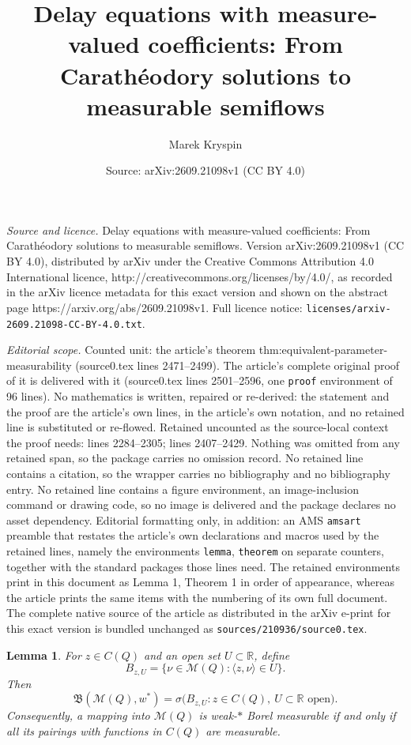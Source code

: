 \documentclass[10pt,a4paper]{amsart}
\title{Delay equations with measure-valued coefficients: From Carath\'eodory solutions to measurable semiflows}
\author{Marek Kryspin}
\date{Source: arXiv:2609.21098v1 (CC BY 4.0)}
\newtheorem{lemma}{Lemma}
\begin{document}
\maketitle

\noindent\emph{Source and licence.} Delay equations with measure-valued coefficients: From Carath\'eodory solutions to measurable semiflows. Version arXiv:2609.21098v1 (CC BY 4.0), distributed by arXiv under the Creative Commons Attribution 4.0 International licence, http://creativecommons.org/licenses/by/4.0/, as recorded in the arXiv licence metadata for this exact version and shown on the abstract page https://arxiv.org/abs/2609.21098v1. Full licence notice: \texttt{licenses/arxiv-2609.21098-CC-BY-4.0.txt}.\par\smallskip

\noindent\textit{Editorial scope.} Counted unit: the article's theorem thm:equivalent-parameter-measurability (source0.tex lines 2471--2499). The article's complete original proof of it is delivered with it (source0.tex lines 2501--2596, one \texttt{proof} environment of 96 lines). No mathematics is written, repaired or re-derived: the statement and the proof are the article's own lines, in the article's own notation, and no retained line is substituted or re-flowed.  Retained uncounted as the source-local context the proof needs: lines 2284--2305; lines 2407--2429.  Nothing was omitted from any retained span, so the package carries no omission record.  No retained line contains a citation, so the wrapper carries no bibliography and no bibliography entry.  No retained line contains a figure environment, an image-inclusion command or drawing code, so no image is delivered and the package declares no asset dependency.  Editorial formatting only, in addition: an AMS \texttt{amsart} preamble that restates the article's own declarations and macros used by the retained lines, namely the environments \texttt{lemma}, \texttt{theorem} on separate counters, together with the standard packages those lines need.  The retained environments print in this document as Lemma 1, Theorem 1 in order of appearance, whereas the article prints the same items with the numbering of its own full document.  The complete native source of the article as distributed in the arXiv e-print for this exact version is bundled unchanged as \texttt{sources/210936/source0.tex}.
\begin{lemma}\label{lem:measure-Borel}
For $z\in C(Q)$ and an open set $U\subset\mathbb R$,
define
\begin{equation*}
    B_{z,U}
    =
    \{\nu\in\mathcal M(Q):\langle z,\nu\rangle\in U\}.
\end{equation*}
Then
\begin{equation*}
    \mathfrak B(\mathcal M(Q),w^*)
    =
    \sigma\bigl(
        B_{z,U}:
        z\in C(Q),\
        U\subset\mathbb R\text{ open}
    \bigr).
\end{equation*}
Consequently, a mapping into $\mathcal M(Q)$ is
weak-$*$ Borel measurable if and only if all its pairings
with functions in $C(Q)$ are measurable.
\end{lemma}
\end{document}
